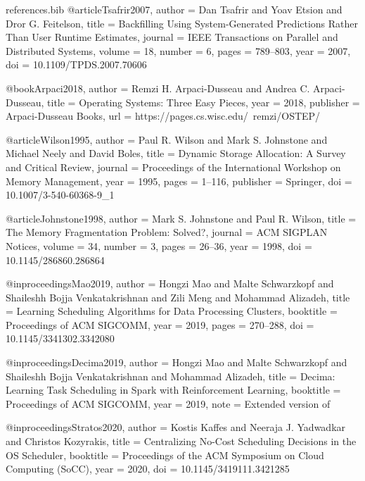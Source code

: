 \begin{filecontents*}{references.bib}
@article{Tsafrir2007,
  author    = {Dan Tsafrir and Yoav Etsion and Dror G. Feitelson},
  title     = {Backfilling Using System-Generated Predictions Rather Than User Runtime Estimates},
  journal   = {IEEE Transactions on Parallel and Distributed Systems},
  volume    = {18},
  number    = {6},
  pages     = {789--803},
  year      = {2007},
  doi       = {10.1109/TPDS.2007.70606}
}

@book{Arpaci2018,
  author    = {Remzi H. Arpaci-Dusseau and Andrea C. Arpaci-Dusseau},
  title     = {Operating Systems: Three Easy Pieces},
  year      = {2018},
  publisher = {Arpaci-Dusseau Books},
  url       = {https://pages.cs.wisc.edu/~remzi/OSTEP/}
}

@article{Wilson1995,
  author    = {Paul R. Wilson and Mark S. Johnstone and Michael Neely and David Boles},
  title     = {Dynamic Storage Allocation: A Survey and Critical Review},
  journal   = {Proceedings of the International Workshop on Memory Management},
  year      = {1995},
  pages     = {1--116},
  publisher = {Springer},
  doi       = {10.1007/3-540-60368-9_1}
}

@article{Johnstone1998,
  author    = {Mark S. Johnstone and Paul R. Wilson},
  title     = {The Memory Fragmentation Problem: Solved?},
  journal   = {ACM SIGPLAN Notices},
  volume    = {34},
  number    = {3},
  pages     = {26--36},
  year      = {1998},
  doi       = {10.1145/286860.286864}
}

@inproceedings{Mao2019,
  author    = {Hongzi Mao and Malte Schwarzkopf and Shaileshh Bojja Venkatakrishnan and Zili Meng and Mohammad Alizadeh},
  title     = {Learning Scheduling Algorithms for Data Processing Clusters},
  booktitle = {Proceedings of ACM SIGCOMM},
  year      = {2019},
  pages     = {270--288},
  doi       = {10.1145/3341302.3342080}
}

@inproceedings{Decima2019,
  author    = {Hongzi Mao and Malte Schwarzkopf and Shaileshh Bojja Venkatakrishnan and Mohammad Alizadeh},
  title     = {Decima: Learning Task Scheduling in Spark with Reinforcement Learning},
  booktitle = {Proceedings of ACM SIGCOMM},
  year      = {2019},
  note      = {Extended version of \cite{Mao2019}}
}

@inproceedings{Stratos2020,
  author    = {Kostis Kaffes and Neeraja J. Yadwadkar and Christos Kozyrakis},
  title     = {Centralizing No-Cost Scheduling Decisions in the OS Scheduler},
  booktitle = {Proceedings of the ACM Symposium on Cloud Computing (SoCC)},
  year      = {2020},
  doi       = {10.1145/3419111.3421285}
}


\end{filecontents*}
